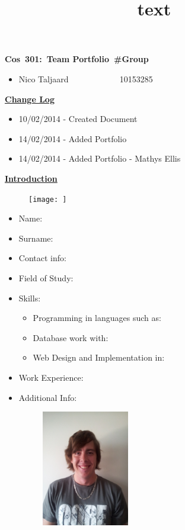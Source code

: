 \documentclass[12pt]{article}
\newcommand{\Title}{Team Portfolio\ \#Group } %
\newcommand{\Class}{Cos\ 301} %
\begin{document}
\title{text}
	\vspace{2in}
	\hspace{1.5in}
	\textmd{\textbf{\Class:\ \Title}}\\
	\vspace{1.5in}


\begin{itemize} %
	\item Nico Taljaard \ ~~~~~~~~~ \ 10153285
	
\end{itemize}

\newpage
\textbf{\underline{Change Log}}
\begin{itemize}
	\item 10/02/2014 - Created Document
	\item 14/02/2014 - Added Portfolio
	\item 14/02/2014 - Added Portfolio - Mathys Ellis
\end{itemize}


\newpage
\textbf{\underline{Introduction}}


\newpage %
\begin{figure}[ht!]
	\centering
	\texttt{[image: ]}
\end{figure}

\begin{itemize}
	\item Name: \ ~~~~~~~~~~~~~~~ \ 
	\item Surname: \ ~~~~~~~~~~~ \ 
	\item Contact info: \ ~~~~~~ \  \newline 
	\item Field of Study: \ ~~~~ \ 
	\item Skills: \begin{itemize}
					\item Programming in languages such as:
					\item Database work with: 
					\item Web Design and Implementation in:     %
				  \end{itemize}
	\item Work Experience: \  \ 
	\item Additional Info: \ ~~ \ 
	
\end{itemize}

\newpage
\begin{figure}[ht!]
	\centering
	\includegraphics[width=2in, height=2in]{./Pictures/NicoTaljaard.jpg}
\end{figure}
\end{document}
